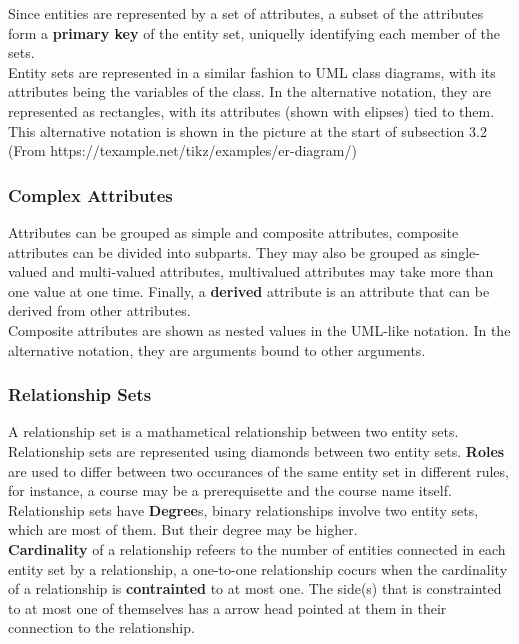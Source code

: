\documentclass[11pt,a4paper,twocolumn]{book}
\begin{document}
Since entities are represented by a set of attributes, a subset of the attributes form a \textbf{primary key} of the entity set, uniquelly identifying each member of the sets.\\

Entity sets are represented in a similar fashion to UML class diagrams, with its attributes being the variables of the class. In the alternative notation, they are represented as rectangles, with its attributes (shown with elipses) tied to them. This alternative notation is shown in the picture at the start of subsection 3.2 (From https://texample.net/tikz/examples/er-diagram/)

\subsubsection{Complex Attributes}

Attributes can be grouped as simple and composite attributes, composite attributes can be divided into subparts. They may also be grouped as single-valued and multi-valued attributes, multivalued attributes may take more than one value at one time. Finally, a \textbf{derived} attribute is an attribute that can be derived from other attributes.\\

Composite attributes are shown as nested values in the UML-like notation. In the alternative notation, they are arguments bound to other arguments.

\subsubsection{Relationship Sets}

A relationship set is a mathametical relationship between two entity sets. Relationship sets are represented using diamonds between two entity sets. \textbf{Roles} are used to differ between two occurances of the same entity set in different rules, for instance, a course may be a prerequisette and the course name itself.\\

Relationship sets have \textbf{Degree}s, binary relationships involve two entity sets, which are most of them. But their degree may be higher.\\

\textbf{Cardinality} of a relationship refeers to the  number of entities connected in each entity set by a relationship,  a one-to-one relationship cocurs when the cardinality of a relationship is \textbf{contrainted} to at most one. The side(s) that is constrainted to at most one of themselves has a arrow head pointed at them in their connection to the relationship.\\
\end{document}
